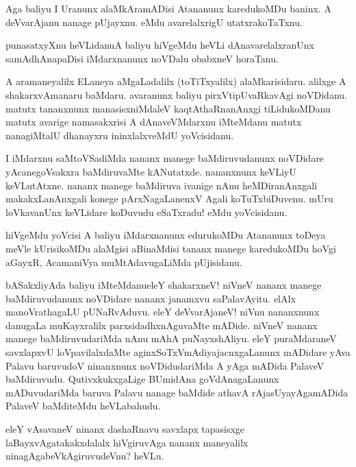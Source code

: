 \begin{mng}
Aga baliyu I Uranunx alaMkAramADisi Atananunx karedukoMDu baninx. A deVvarAjanu nanage pUjayxnu. eMdu avarelalxrigU utatxrakoTaTxnu.
\end{mng}

\begin{mng}
punasatxyXnu heVLidanu\mdash A baliyu hiVgeMdu heVLi dAnavarelalxranUnx samAdhAnapaDisi iMdarxnanunx noVDalu obabxneV horaTanu.
\end{mng}

\begin{mng}
A aramaneyalilx ELaneya aMgaLadalilx (toTiTxyalilx) alaMkarisidaru. alilxge A shakarxvAmanaru baMdaru. avaranunx baliyu pirxVtipUvaRkavAgi noVDidanu. matutx tananxnunx manasisxniMdaleV kaqtAthaRnanAnxgi tiLidukoMDanu matutx avarige namasakxrisi A dAnaveVMdarxnu iMteMdanu matutx nanagiMtalU dhanayxru ininxlalxveMdU yoVcisidanu.
\end{mng}

\begin{mng}
I iMdarxnu saMtoVSadiMda nananx manege baMdiruvudanunx noVDidare yAcanegoVsakxra baMdiruvaMte kANutatxde. nananxnunx keVLiyU keVLutAtxne. nananx manege baMdiruva ivanige nAnu heMDiranAnxgali makakxLanAnxgali konege pArxNagaLanenxV Agali koTuTxbiDuvenu. mUru loVkavanUnx keVLidare koDuvudu eSaTxradu! eMdu yoVcisidanu.
\end{mng}

\begin{mng}
hiVgeMdu yoVcisi A baliyu iMdarxnanunx edurukoMDu Atananunx toDeya meVle kUrisikoMDu alaMgisi aBinaMdisi tananx manege karedukoMDu hoVgi aGayxR, AcamaniVya muMtAdavugaLiMda pUjisidanu.
\end{mng}

\begin{mng}
bASakxliyAda baliyu iMteMdanu\mdash eleY shakarxneV! niVneV nananx manege baMdiruvudanunx noVDidare nananx janamxvu saPalavAyitu. elAlx manoVrathagaLU pUNaRvAduvu. eleY deVvarAjaneV! niVnu nananxnunx danugaLa muKayxralilx parxsidadhxnAguvaMte mADide. niVneV nananx manege baMdiruvudariMda nAnu mAhA puNayxshAliyu. eleY puraMdaraneV savxlapxvU loVpavilalxdaMte aginxSoTxVmAdiyajacnxgaLanunx mADidare yAva Palavu baruvudoV ninanxnunx noVDidudariMda A yAga mADida PalaveV baMdiruvudu. QutivxkukxgaLige BUmidAna goVdAnagaLanunx mADuvudariMda baruva Palavu nanage baMdide athavA rAjasUyayAgamADida PalaveV baMditeMdu heVLabahudu.
\end{mng}

\begin{mng}
eleY vAsavaneV ninanx dashaRnavu savxlapx tapasisxge laBayxvAgatakakxdalalx hiVgiruvAga nananx maneyalilx ninagAgabeVkAgiruvudeVnu? heVLu.
\end{mng}

